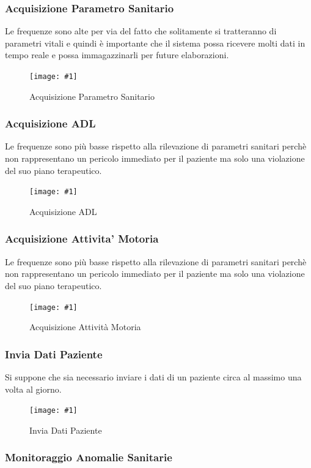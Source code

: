 \documentclass[a4paper,11pt,oneside, table]{article}
\newcommand{\putimage}[4] {
	\begin{figure}[H]
	    \centering
	    \texttt{[image: \#1]}
	    \caption{#2}\label{#3}
	\end{figure}
}
\begin{document}
\subsubsection{Acquisizione Parametro Sanitario}

Le frequenze sono alte per via del fatto che solitamente si tratteranno di parametri vitali e quindi \`e importante che il sistema possa ricevere molti dati in tempo reale e possa immagazzinarli per future elaborazioni.

\putimage{images/Diagramma delle Attivita'/Acquisizione Parametro Sanitario.png}{Acquisizione Parametro Sanitario}{png:act:acquisizione-parametro-sanitario}{1}

\subsubsection{Acquisizione ADL}

Le frequenze sono pi\`u basse rispetto alla rilevazione di parametri sanitari perch\`e non rappresentano un pericolo immediato per il paziente ma solo una violazione del suo piano terapeutico.

\putimage{images/Diagramma delle Attivita'/Acquisizione ADL.png}{Acquisizione ADL}{png:act:acquisizione-adl}{1}

\subsubsection{Acquisizione Attivita' Motoria}

Le frequenze sono pi\`u basse rispetto alla rilevazione di parametri sanitari perch\`e non rappresentano un pericolo immediato per il paziente ma solo una violazione del suo piano terapeutico.

\putimage{images/Diagramma delle Attivita'/Acquisizione Attivita' Motoria.png}{Acquisizione Attivit\`a Motoria}{png:act:acquisizione-attivita-motoria}{1}

\subsubsection{Invia Dati Paziente}

Si suppone che sia necessario inviare i dati di un paziente circa al massimo una volta al giorno.

\putimage{images/Diagramma delle Attivita'/Invia Dati Paziente.png}{Invia Dati Paziente}{png:act:invia-dati-paziente}{1}

\subsubsection{Monitoraggio Anomalie Sanitarie}
\end{document}
